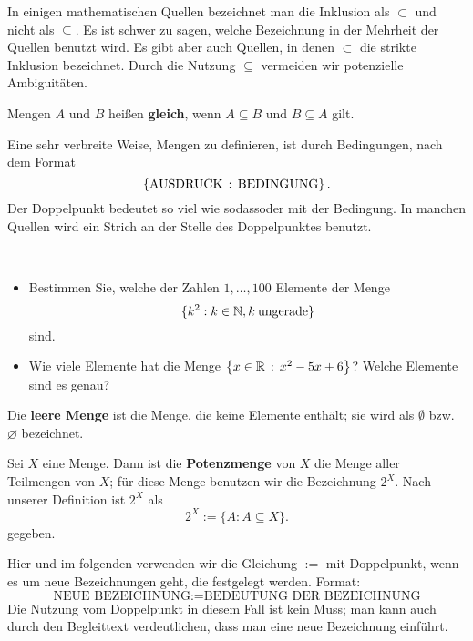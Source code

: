\begin{bem}
In einigen mathematischen Quellen bezeichnet man die Inklusion als $ \subset $ und nicht als $ \subseteq $. Es ist schwer zu sagen, welche Bezeichnung in der Mehrheit der Quellen benutzt wird. Es gibt aber auch Quellen, in denen $ \subset $ die strikte Inklusion bezeichnet. Durch die Nutzung $\subseteq$ vermeiden wir potenzielle Ambiguitäten. 
\end{bem} 

\begin{defn}
	 Mengen $ A $ und $ B $ heißen \textbf{gleich}, wenn $ A \subseteq B $ und $ B \subseteq A $ gilt. 
\end{defn} 


\begin{bem}
Eine sehr verbreite Weise, Mengen zu definieren, ist durch Bedingungen, nach dem Format 
\[
 \left\{  \text{AUSDRUCK}  \,:\, \text{BEDINGUNG} \right\}. 
\] Der Doppelpunkt bedeutet so viel wie \glqq sodass\grqq oder \glqq mit der Bedingung\grqq. In manchen Quellen wird ein Strich an der Stelle des Doppelpunktes benutzt. 
\end{bem} 

\begin{aufg}\ 
\begin{itemize}
\item Bestimmen Sie, welche der Zahlen $1,\ldots, 100$ Elemente der Menge 
\[
	 \{ k^2 : k \in \mathbb{N}, k \: \text{ungerade} \} 
\]
sind. 
\item Wie viele Elemente hat die Menge $\left\{ x \in \mathbb{R} \,:\, x^2- 5 x + 6 \right\} $? Welche Elemente sind es genau? 
\end{itemize}
\end{aufg}

\begin{defn}
Die \textbf{leere Menge} ist die Menge, die keine Elemente enthält; sie wird als $ \emptyset $ bzw. $\varnothing$ bezeichnet. 
\end{defn} 

\begin{defn}[Potenzmenge]
Sei $ X $ eine Menge. Dann ist die \textbf{Potenzmenge} von $ X $ die Menge aller Teilmengen von $ X $; für diese Menge benutzen wir die Bezeichnung $ 2^X $. Nach unserer Definition ist $2^X$ als  
\[
	 2^X := \{ A : A \subseteq X \} .
\]
gegeben. 
\end{defn} 

\begin{bem} Hier und im folgenden verwenden wir die Gleichung $:=$ mit Doppelpunkt, wenn es um neue Bezeichnungen geht, die festgelegt werden. Format: 
	\[
		\text{NEUE BEZEICHNUNG} := \text{BEDEUTUNG DER BEZEICHNUNG}
	\]
	Die Nutzung vom Doppelpunkt in diesem Fall ist kein Muss; man kann auch durch den Begleittext verdeutlichen, dass man eine neue Bezeichnung einführt. 
\end{bem} 

